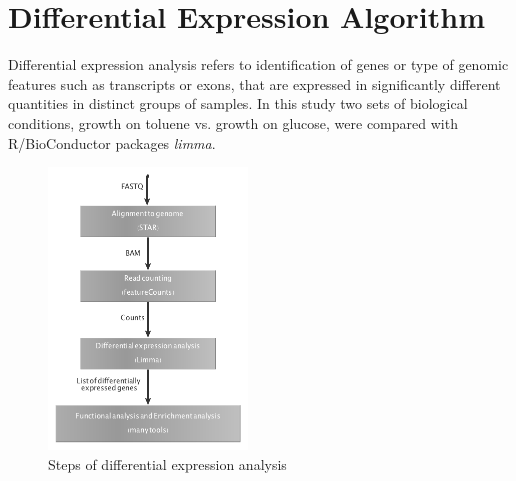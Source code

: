 \documentclass[12pt, a4paper]{report}
\begin{document}
\section{Differential Expression Algorithm}
Differential expression analysis refers to identification of genes or type of genomic features such as transcripts or exons, that are expressed in significantly different quantities in distinct groups of samples. In this study two sets of biological conditions, growth on toluene vs. growth on glucose, were compared with R/BioConductor packages \textit{limma}.\\

\begin{figure}[H]
	\centering	
	\includegraphics[width=150pt]{pics/diffgraph}
	\caption[Steps of differential expression analysis]
	{Steps of differential expression analysis}
\end{figure}
\end{document}
